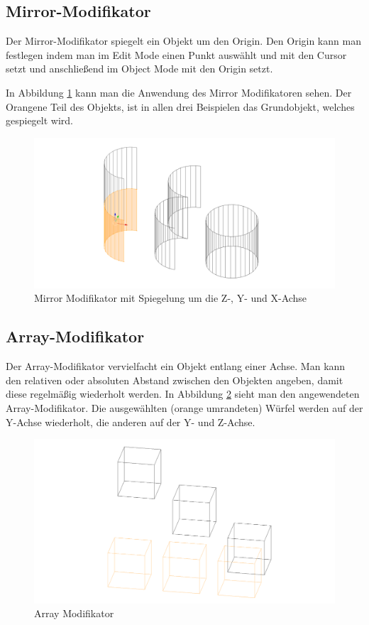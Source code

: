 \subsection{Mirror-Modifikator}\citep{blender:mirror_modifier}
\label{Mirror:heading}
Der Mirror-Modifikator spiegelt ein Objekt um den Origin.
Den Origin kann man festlegen indem man im Edit Mode einen Punkt auswählt
und mit   den Cursor setzt und anschließend im Object Mode mit 
 den Origin setzt.

In Abbildung \ref{modifikatoren:image2} kann man die Anwendung des Mirror Modifikatoren sehen. Der Orangene Teil des Objekts, ist in allen drei Beispielen das
Grundobjekt, welches gespiegelt wird.

\begin{figure}[h]
    \centering
    \includegraphics[width=.8\textwidth]{images/Modifikatoren-Mirror.png}
    \caption{Mirror Modifikator mit Spiegelung um die Z-, Y- und X-Achse}
    \label{modifikatoren:image2}
\end{figure}

\subsection{Array-Modifikator}\citep{blender:array_modifier}
\label{Array:heading}
Der Array-Modifikator vervielfacht ein Objekt entlang einer Achse. Man kann den relativen oder absoluten Abstand zwischen den Objekten
angeben, damit diese regelmäßig wiederholt werden. In Abbildung \ref{modifikatoren:image3} sieht man den angewendeten Array-Modifikator.
Die ausgewählten (orange umrandeten) Würfel werden auf der Y-Achse
wiederholt, die anderen auf der Y- und Z-Achse.
\begin{figure}[h]
    \centering
    \includegraphics[width=.8\textwidth]{images/Modifikatoren-Array.png}
    \caption{Array Modifikator}
    \label{modifikatoren:image3}
\end{figure}

